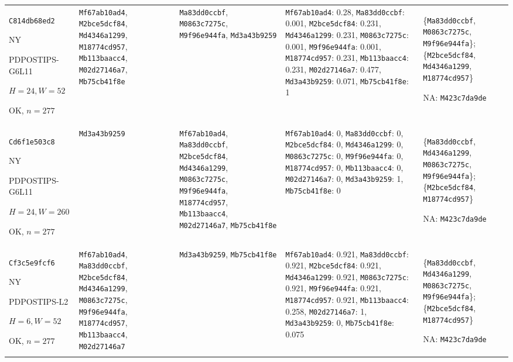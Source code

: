 \begin{longtable}{p{.15\linewidth}p{.17\linewidth}p{.17\linewidth}p{.25\linewidth}p{.14\linewidth}}
\texttt{C814db68ed2}\par NY\par PDPOSTIPS-\allowbreak{}G6L11\par $H=24,W=52$\par OK, $n=277$ & \texttt{Mf67ab10ad4}, \texttt{M2bce5dcf84}, \texttt{Md4346a1299}, \texttt{M18774cd957}, \texttt{Mb113baacc4}, \texttt{M02d27146a7}, \texttt{Mb75cb41f8e} & \texttt{Ma83dd0ccbf}, \texttt{M0863c7275c}, \texttt{M9f96e944fa}, \texttt{Md3a43b9259} & \texttt{Mf67ab10ad4}: 0.28, \texttt{Ma83dd0ccbf}: 0.001, \texttt{M2bce5dcf84}: 0.231, \texttt{Md4346a1299}: 0.231, \texttt{M0863c7275c}: 0.001, \texttt{M9f96e944fa}: 0.001, \texttt{M18774cd957}: 0.231, \texttt{Mb113baacc4}: 0.231, \texttt{M02d27146a7}: 0.477, \texttt{Md3a43b9259}: 0.071, \texttt{Mb75cb41f8e}: 1 & \{\texttt{Ma83dd0ccbf}, \texttt{M0863c7275c}, \texttt{M9f96e944fa}\}; \{\texttt{M2bce5dcf84}, \texttt{Md4346a1299}, \texttt{M18774cd957}\}\par NA: \texttt{M423c7da9de} \\
\texttt{Cd6f1e503c8}\par NY\par PDPOSTIPS-\allowbreak{}G6L11\par $H=24,W=260$\par OK, $n=277$ & \texttt{Md3a43b9259} & \texttt{Mf67ab10ad4}, \texttt{Ma83dd0ccbf}, \texttt{M2bce5dcf84}, \texttt{Md4346a1299}, \texttt{M0863c7275c}, \texttt{M9f96e944fa}, \texttt{M18774cd957}, \texttt{Mb113baacc4}, \texttt{M02d27146a7}, \texttt{Mb75cb41f8e} & \texttt{Mf67ab10ad4}: 0, \texttt{Ma83dd0ccbf}: 0, \texttt{M2bce5dcf84}: 0, \texttt{Md4346a1299}: 0, \texttt{M0863c7275c}: 0, \texttt{M9f96e944fa}: 0, \texttt{M18774cd957}: 0, \texttt{Mb113baacc4}: 0, \texttt{M02d27146a7}: 0, \texttt{Md3a43b9259}: 1, \texttt{Mb75cb41f8e}: 0 & \{\texttt{Ma83dd0ccbf}, \texttt{Md4346a1299}, \texttt{M0863c7275c}, \texttt{M9f96e944fa}\}; \{\texttt{M2bce5dcf84}, \texttt{M18774cd957}\}\par NA: \texttt{M423c7da9de} \\
\texttt{Cf3c5e9fcf6}\par NY\par PDPOSTIPS-\allowbreak{}L2\par $H=6,W=52$\par OK, $n=277$ & \texttt{Mf67ab10ad4}, \texttt{Ma83dd0ccbf}, \texttt{M2bce5dcf84}, \texttt{Md4346a1299}, \texttt{M0863c7275c}, \texttt{M9f96e944fa}, \texttt{M18774cd957}, \texttt{Mb113baacc4}, \texttt{M02d27146a7} & \texttt{Md3a43b9259}, \texttt{Mb75cb41f8e} & \texttt{Mf67ab10ad4}: 0.921, \texttt{Ma83dd0ccbf}: 0.921, \texttt{M2bce5dcf84}: 0.921, \texttt{Md4346a1299}: 0.921, \texttt{M0863c7275c}: 0.921, \texttt{M9f96e944fa}: 0.921, \texttt{M18774cd957}: 0.921, \texttt{Mb113baacc4}: 0.258, \texttt{M02d27146a7}: 1, \texttt{Md3a43b9259}: 0, \texttt{Mb75cb41f8e}: 0.075 & \{\texttt{Ma83dd0ccbf}, \texttt{Md4346a1299}, \texttt{M0863c7275c}, \texttt{M9f96e944fa}\}; \{\texttt{M2bce5dcf84}, \texttt{M18774cd957}\}\par NA: \texttt{M423c7da9de} \\

\end{longtable}
